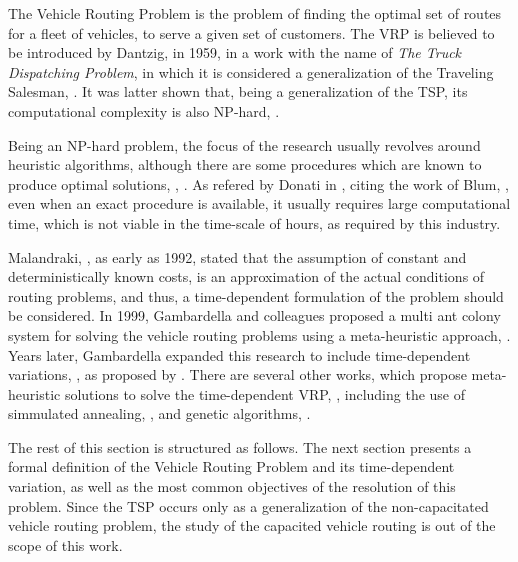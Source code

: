 The Vehicle Routing Problem is the problem of finding the optimal set of routes for a fleet of vehicles,
to serve a given set of customers.
The VRP is believed to be introduced by Dantzig, in 1959, in a work with the name of \textit{The Truck Dispatching Problem},
in which it is considered a generalization of the Traveling Salesman, \cite{truck_problem_dantzig}. 
It was latter shown that, being a generalization of the TSP, its computational complexity is also NP-hard, \cite{VRP_complexity}. 

Being an NP-hard problem, the focus of the research usually revolves around heuristic algorithms, although there are some procedures
which are known to produce optimal solutions, \cite{VRP_exact_heuristic}, \cite{TDVRP_exact}. As refered by Donati in \cite{MACS_VRPTW}, citing the work of Blum, \cite{blum_complexity},
even when an exact procedure is available, it usually requires large computational time, which is not viable in the time-scale of hours, as required by this industry. 

Malandraki, \cite{TDVRP_92}, as early as 1992, stated that the assumption of constant and deterministically known costs,
is an approximation of the actual conditions of routing problems, and thus, a time-dependent formulation of the problem should be considered.
In 1999, Gambardella and colleagues proposed a multi ant colony system for solving the vehicle routing problems using a meta-heuristic approach, \cite{MACS_VRPTW}. 
Years later, Gambardella expanded this research to include time-dependent variations, \cite{TDVRP_multi_objective_aco}, as proposed by \cite{TDVRP_92}. 
There are several other works, which propose meta-heuristic solutions to solve the time-dependent VRP, \cite{VRP_meta}, including the use of simmulated annealing, \cite{tdvrp_costs},
and genetic algorithms, \cite{TDVRP_GA}. 

The rest of this section is structured as follows. The next section presents a formal definition of the Vehicle Routing Problem and its time-dependent variation,
as well as the most common objectives of the resolution of this problem. Since the TSP occurs only as a generalization of the non-capacitated vehicle routing problem,
the study of the capacited vehicle routing is out of the scope of this work.
